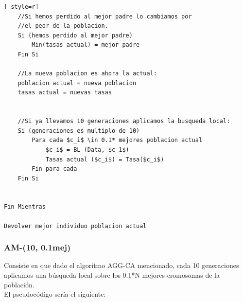 \begin{lstlisting}[ style=r]
	//Si hemos perdido al mejor padre lo cambiamos por 
	//el peor de la poblacion.
	Si (hemos perdido al mejor padre)
		Min(tasas actual) = mejor padre
	Fin Si
	
	//La nueva poblacion es ahora la actual:
	poblacion actual = nueva poblacion
	tasas actual = nuevas tasas
	
	
	//Si ya llevamos 10 generaciones aplicamos la busqueda local:
	Si (generaciones es multiplo de 10)
		Para cada $c_i$ \in 0.1* mejores poblacion actual
			$c_i$ = BL (Data, $c_1$)
			Tasas actual ($c_i$) = Tasa($c_i$)
		Fin para cada
	Fin Si


Fin Mientras

Devolver mejor individuo poblacion actual
\end{lstlisting}



\subsubsection{AM-(10, 0.1mej)}
Consiste en que dado el algoritmo AGG-CA mencionado, cada 10 generaciones aplicamos una búsqueda local sobre los 0.1*N mejores cromosomas de la población.\\ 
El pseudocódigo sería el siguiente:


